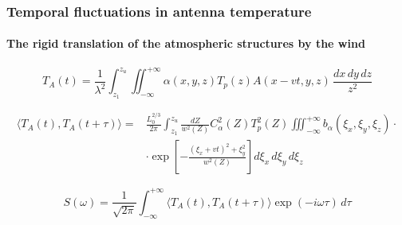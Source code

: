 \documentclass[aspectratio=169]{beamer}
\begin{document}
\begin{frame}
    \frametitle{Temporal fluctuations in antenna temperature}
    \framesubtitle{The rigid translation of the atmospheric structures by the wind}
    \begin{equation}
        T_A(t) = \frac{1}{\lambda^2}\int_{z_1}^{z_u}\iint_{-\infty}^{+\infty}\alpha(x,y,z)T_p(z)A(x-vt,y,z)\,\frac{dx\,dy\,dz}{z^2}
    \end{equation}

    \begin{equation}
        \begin{split}
            \langle T_A(t), T_A(t+\tau) \rangle = &\frac{L_0^{2/3}}{2\pi}\int_{z_1}^{z_u}\frac{dZ}{w^2(Z)} C_\alpha^2(Z) T_p^2(Z) \iiint_{-\infty}^{+\infty}b_\alpha(\xi_x, \xi_y, \xi_z) \cdot \\
            &\cdot \exp\left[-\frac{(\xi_x+vt)^2+\xi_y^2}{w^2(Z)}\right] d\xi_x\,d\xi_y\,d\xi_z
        \end{split}
    \end{equation}

    \begin{equation}
        S(\omega) = \frac{1}{\sqrt{2\pi}} \int_{-\infty}^{+\infty} \langle T_A(t), T_A(t+\tau) \rangle \exp(-i\omega\tau)\,d\tau
    \end{equation}
\end{frame}
\end{document}
